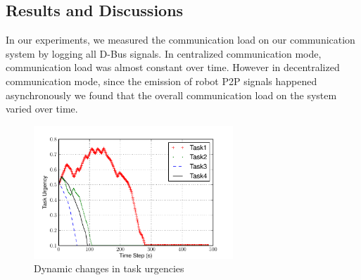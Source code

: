 \documentclass{ifacconf}
\begin{document}
\subsection{Results and Discussions}
In our experiments, we measured the communication load on our communication system by logging all D-Bus signals. In  centralized communication mode, communication load was almost constant over time.  However in decentralized communication mode, since the emission of robot P2P signals happened asynchronously we found that the overall communication load on the system varied over time. 
\begin{figure}
\begin{center}
\includegraphics[width=7.5cm,height=5cm]{./images/PlotUrgencyLog-2010Feb15-171017}    %
\caption{Dynamic changes in task urgencies} 
\label{fig:task-urgency}
\end{center}
\end{figure}
\end{document}
